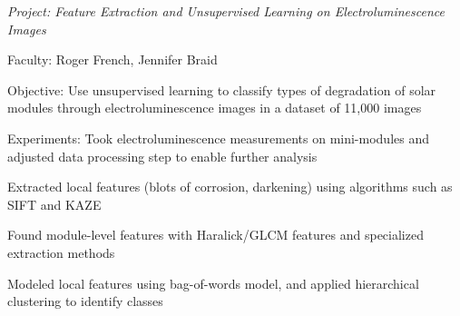 \documentclass[10pt]{article}
\begin{document}
{	
%	
	
	\textit{Project: Feature Extraction and Unsupervised Learning on Electroluminescence Images}
}	{\begin{newitemize}
		\item{Faculty: Roger French, Jennifer Braid}
		\item{Objective: Use unsupervised learning to classify types of degradation of solar modules through electroluminescence images in a dataset of 11,000 images}
		\item{Experiments: Took electroluminescence measurements on mini-modules and adjusted data processing step to enable further analysis}
		\item{Extracted local features (blots of corrosion, darkening) using algorithms such as SIFT and KAZE}
		\item{Found module-level features with Haralick/GLCM features and specialized extraction methods}
		\item{Modeled local features using bag-of-words model, and applied hierarchical clustering to identify classes}
		
		
	\end{newitemize}}
\end{document}
